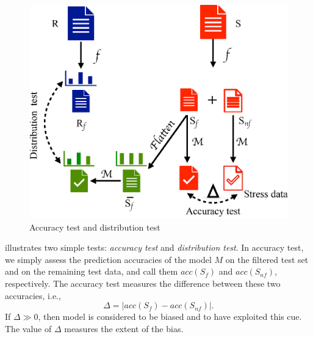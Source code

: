 \begin{figure}[th]
\centering
\includegraphics[width=0.6\columnwidth]{picture/framework.eps}
\caption{Accuracy test and distribution test}
\label{fig:framework}
\end{figure}

%
%

 illustrates two simple tests: \textit{accuracy test} and \textit{distribution test}.
In accuracy test, we simply assess the prediction accuracies of the model
$M$ on the filtered test set and on the remaining test data, and call them
$acc(S_f)$ and $acc(S_{nf})$, respectively. The accuracy test measures the difference
between these two accuracies, i.e., 
\begin{equation}
\Delta= |acc(S_f) - acc(S_{nf})|.
\end{equation} 
If $\Delta \gg 0$, then model is considered to be biased and to have exploited this cue. 
The value of $\Delta$ measures the extent of the bias.
 
